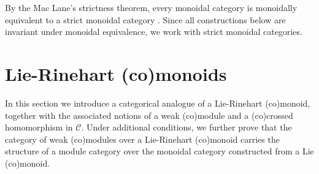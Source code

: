 \documentclass[11pt]{amsart}
\newcommand{\calC}{\mathcal{C}}
\theoremstyle{definition}
\numberwithin{equation}{section}
\begin{document}
		
By the Mac Lane's strictness theorem, every monoidal category is monoidally equivalent to a strict monoidal category \cite{Mac98}.
Since all constructions below are invariant under monoidal equivalence, we work with strict monoidal categories. 




		
\section{Lie-Rinehart (co)monoids}\label{secoflierinehart}
In this section we introduce a categorical analogue of a Lie-Rinehart (co)monoid, together with the associated notions of a weak (co)module and a (co)crossed homomorphism in $\calC$. Under additional conditions, we further prove that the category of weak (co)modules over a Lie-Rinehart (co)monoid carries the structure of a module category over the monoidal category constructed from a Lie (co)monoid.
\end{document}
